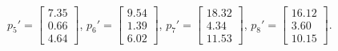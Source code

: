 \documentclass[accentcolor=tud9c,colorbacktitle,inverttitle,landscape,german,presentation,t]{tudbeamer}
\begin{document}
\begin{frame}
{	$p_5'=\begin{bmatrix}  7.35\\0.66 \\4.64 \end{bmatrix}$, %
	$p_6'=\begin{bmatrix}  9.54\\1.39 \\6.02 \end{bmatrix}$, %
	$p_7'=\begin{bmatrix}  18.32\\4.34 \\11.53 \end{bmatrix}$, %
	$p_8'=\begin{bmatrix}  16.12\\3.60 \\10.15 \end{bmatrix}$. %
}
	
\end{frame}
\end{document}
